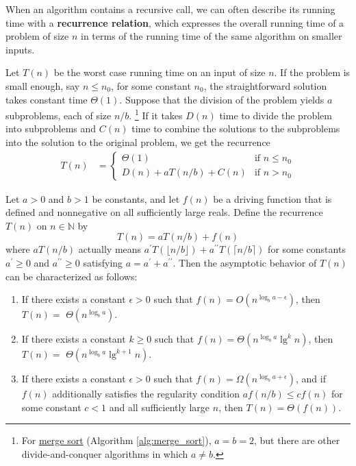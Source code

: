 

When an algorithm contains a recursive call, we can often describe its running time with a \textbf{recurrence relation}, which expresses the overall running time of a problem of size $n$ in terms of the running time of the same algorithm on smaller inputs.


Let $T(n)$ be the worst case running time on an input of size $n$.
If the problem is small enough, say $n \leq n_0$, for some constant $n_0$, the straightforward solution takes constant time $\Theta(1)$.
Suppose that the division of the problem yields $a$ subproblems, each of size $n/b$.%
\footnote{For \hyperref[sec:merge_sort]{merge sort} (Algorithm \ref{alg:merge_sort}), $a = b = 2$, but there are other divide-and-conquer algorithms in which $a \neq b$.}
If it takes $D(n)$ time to divide the problem into subproblems and $C(n)$ time to combine the solutions to the subproblems into the solution to the original problem, we get the recurrence
\begin{align}
\label{eq:recurrence_relation}
T(n) &=
\begin{cases}
    \Theta(1) & \text{if } n \leq n_0 \\
    D(n) + aT(n/b) + C(n) & \text{if } n > n_0
\end{cases}
\end{align}

\begin{theorem}
\label{thm:master_theorem}
Let $a>0$ and $b>1$ be constants, and let $f(n)$ be a driving function that is defined and nonnegative on all sufficiently large reals. Define the recurrence $T(n)$ on $n \in \mathbb{N}$ by
\[
T(n)=a T(n / b)+f(n)
\]
where $a T(n / b)$ actually means $a^{\prime} T(\lfloor n / b\rfloor)+a^{\prime \prime} T(\lceil n / b\rceil)$ for some constants $a^{\prime} \geq 0$ and $a^{\prime \prime} \geq 0$ satisfying $a=a^{\prime}+a^{\prime \prime}$. Then the asymptotic behavior of $T(n)$ can be characterized as follows:
\begin{enumerate}
    \item If there exists a constant $\epsilon>0$ such that $f(n)=O\left(n^{\log _b a-\epsilon}\right)$, then $T(n)=$ $\Theta\left(n^{\log _b a}\right)$.
    \item If there exists a constant $k \geq 0$ such that $f(n)=\Theta\left(n^{\log _b a} \lg ^k n\right)$, then $T(n)=$ $\Theta\left(n^{\log _b a} \lg ^{k+1} n\right)$.
    \item If there exists a constant $\epsilon>0$ such that $f(n)=\Omega\left(n^{\log _b a+\epsilon}\right)$, and if $f(n)$ additionally satisfies the regularity condition $a f(n / b) \leq c f(n)$ for some constant $c<1$ and all sufficiently large $n$, then $T(n)=\Theta(f(n))$. \qedhere
\end{enumerate}
\end{theorem}

